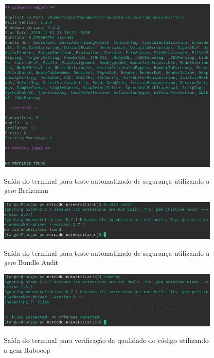 \begin{figure}[htbp!]
  \centering
  \caption{Saída do terminal para teste automatizado de segurança utilizando a \textit{gem} Brakeman}
  \includegraphics[width=1\textwidth]{figs/brakeman.png}
    \label{fig:brakeman}
\end{figure}

\begin{figure}[htbp!]
  \centering
  \caption{Saída do terminal para teste automatizado de segurança utilizando a \textit{gem} Bundle Audit}
  \includegraphics[width=1\textwidth]{figs/bundle_audit.png}
    \label{fig:audit}
\end{figure}

\clearpage
\begin{figure}[h]
  \centering
  \caption{Saída do terminal para verificação da qualidade do código utilizando a gem Rubocop}
  \includegraphics[width=1\textwidth]{figs/rubocop.png}
    \label{fig:rubocop}
\end{figure}
